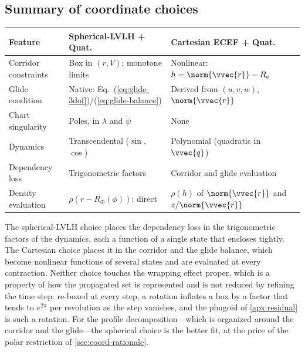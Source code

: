 \subsection{Summary of coordinate choices}\label{sec:summary-table}

\begin{center}
\begin{tabular}{@{}lll@{}}
\toprule
\textbf{Feature} &
\textbf{Spherical-LVLH + Quat.} &
\textbf{Cartesian ECEF + Quat.} \\
\midrule
Corridor constraints &
  Box in $(r,V)$; monotone limits &
  Nonlinear: $h = \norm{\vvec{r}} - R_e$ \\
Glide condition &
  Native: Eq.~(\ref{eq:glide-3dof})/(\ref{eq:glide-balance}) &
  Derived from $(u,v,w)$, $\norm{\vvec{r}}$ \\
Chart singularity &
  Poles, in $\dot\lambda$ and $\dot\psi$ &
  None \\
Dynamics &
  Transcendental ($\sin$, $\cos$) &
  Polynomial (quadratic in $\vvec{q}$) \\
Dependency loss &
  Trigonometric factors &
  Corridor and glide evaluation \\
Density evaluation &
  $\rho(r-R_\oplus(\phi))$: direct &
  $\rho(h)$ of $\norm{\vvec{r}}$ and $z/\norm{\vvec{r}}$ \\
\bottomrule
\end{tabular}
\end{center}

\smallskip\noindent
The spherical-LVLH choice places the dependency loss in the trigonometric
factors of the dynamics, each a function of a single state that encloses
tightly. The Cartesian choice places it in the corridor and the glide
balance, which become nonlinear functions of several states and are
evaluated at every contraction. Neither choice touches the wrapping effect
proper, which is a property of how the propagated set is represented and is
not reduced by refining the time step: re-boxed at every step, a rotation
inflates a box by a factor that tends to $e^{2\pi}$ per revolution as the
step vanishes, and the phugoid of \cref{apx:residual} is such a rotation.
For the profile decomposition---which is organized around the corridor and
the glide---the spherical choice is the better fit, at the price of the
polar restriction of \cref{sec:coord-rationale}.
